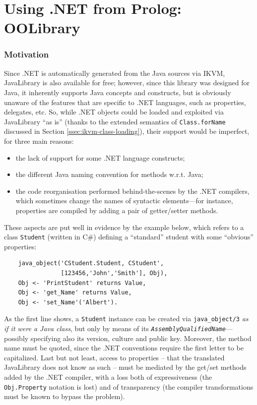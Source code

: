 \section{Using .NET from Prolog: OOLibrary}
\label{sec:dotnet-oolibrary}

\subsubsection{Motivation}

Since \tuprolog{}.NET is automatically generated from the Java sources via IKVM, JavaLibrary is also available for free; however, since this library was designed for Java, it inherently supports Java concepts and constructs, but is obviously unaware of the features that are specific to .NET languages, such as properties, delegates, etc.
%
So, while .NET objects could be loaded and exploited via JavaLibrary ``as is'' (thanks to the extended semantics of \texttt{Class.forName} discussed in Section \ref{ssec:ikvm-class-loading}), their support would be imperfect, for three main reasons:
\begin{itemize}
  \item the lack of support for some .NET language constructs;
  \item the different Java naming convention for methods w.r.t. Java;
  \item the code reorganisation performed behind-the-scenes by the .NET compilers, which sometimes change the names of syntactic elements---for instance, properties are compiled by adding a pair of getter/setter methods.
\end{itemize}

\noindent These aspects are put well in evidence by the example below, which refers to a class \texttt{Student} (written in C\#) defining a ``standard'' student with some ``obvious'' properties:

\begin{verbatim}
    java_object('CStudent.Student, CStudent',
                [123456,'John','Smith'], Obj),
    Obj <- 'PrintStudent' returns Value,
    Obj <- 'get_Name' returns Value,
    Obj <- 'set_Name'('Albert').
\end{verbatim}

\noindent As the first line shows, a \texttt{Student} instance can be created via \texttt{java\_object/3} \textit{as if it were a Java class}, but only by means of its \texttt{\textit{AssemblyQualifiedName}}---possibly specifying also its version, culture and public key.
Moreover, the method name must be quoted, since the .NET conventions require the first letter to be capitalized.
Last but not least, access to properties -- that the translated JavaLibrary does not know  as such -- must be mediated by the get/set methods added by the .NET compiler, with a loss both of expressiveness (the \texttt{Obj.Property} notation is lost) and of transparency (the compiler transformations must be known to bypass the problem).

